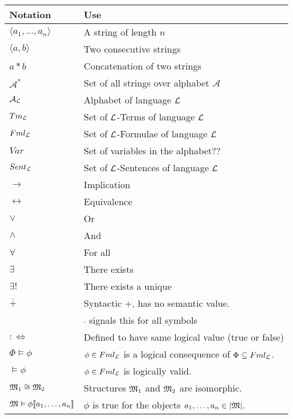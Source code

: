 \documentclass[11pt,a4paper]{article}
\begin{document}
\begin{center}\begin{tabular}{|l|l|}
\hline
\textbf{Notation}&\textbf{Use}\\
\hline$\langle a_1,\dots,a_n\rangle$&A string of length $n$\\
$\langle a,b\rangle$&Two consecutive strings\\
$a*b$&Concatenation of two strings\\
$\mathcal{A}^*$&Set of all strings over alphabet $\mathcal{A}$\\
$\mathcal{A}_{\mathcal{L}}$&Alphabet of language $\mathcal{L}$\\
$Tm_{\mathcal{L}}$&Set of $\mathcal{L}$-Terms of language $\mathcal{L}$\\
$Fml_{\mathcal{L}}$&Set of $\mathcal{L}$-Formulae of language $\mathcal{L}$\\
$Var$&Set of variables in the alphabet??\\
$Sent_{\mathcal{L}}$&Set of $\mathcal{L}$-Sentences of language $\mathcal{L}$\\
$\to$&Implication\\
$\leftrightarrow$&Equivalence\\
$\vee$& Or\\
$\wedge$&And\\
$\forall$&For all\\
$\exists$&There exists\\
$\exists!$&There exists a unique\\
$\bar+$&Syntactic $+$, has no semantic value.\\
&$\bar{ }$ signals this for all symbols\\
$:\Leftrightarrow$&Defined to have same logical value (true or false)\\
$\Phi\vDash\phi$&$\phi\in Fml_{\mathcal{L}}$ is a logical consequence of $\Phi\subseteq Fml_{\mathcal{L}}$.\\
$\vDash\phi$&$\phi\in Fml_{\mathcal{L}}$ is logically valid.\\
$\mathfrak{M}_1\cong\mathfrak{M}_2$&Structures $\mathfrak{M}_1$ and $\mathfrak{M}_2$ are isomorphic.\\
$\mathfrak{M}\vDash\phi[\![a_1,\dots,a_n]\!]$&$\phi$ is true for the objects $a_1,\dots,a_n\in|\mathfrak{M}|$.\\
\hline
\end{tabular}\end{center}
\end{document}
